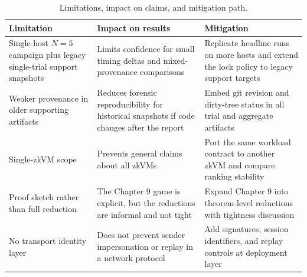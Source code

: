 \begin{table}[H]
\centering
\reporttablesetup
\begin{tabularx}{\textwidth}{@{}LLL@{}}
\hline
Limitation & Impact on results & Mitigation \\
\hline
Single-host \(N=5\) campaign plus legacy single-trial support snapshots & Limits
confidence for small timing deltas and mixed-provenance comparisons & Replicate
headline runs on more hosts and extend the lock policy to legacy support targets \\
Weaker provenance in older supporting artifacts & Reduces forensic
reproducibility for historical snapshots if code changes after the report & Embed
git revision and dirty-tree status in all trial and aggregate artifacts \\
Single-zkVM scope & Prevents general claims about all zkVMs & Port the same
workload contract to another zkVM and compare ranking stability \\
Proof sketch rather than full reduction & The Chapter 9 game is explicit, but
the reductions are informal and not tight & Expand Chapter 9 into theorem-level
reductions with tightness discussion \\
No transport identity layer & Does not prevent sender impersonation or replay in
a network protocol & Add signatures, session identifiers, and replay controls at
deployment layer \\
\hline
\end{tabularx}
\caption{Limitations, impact on claims, and mitigation path.}
\label{tab:limitations-impact-mitigation}
\end{table}
